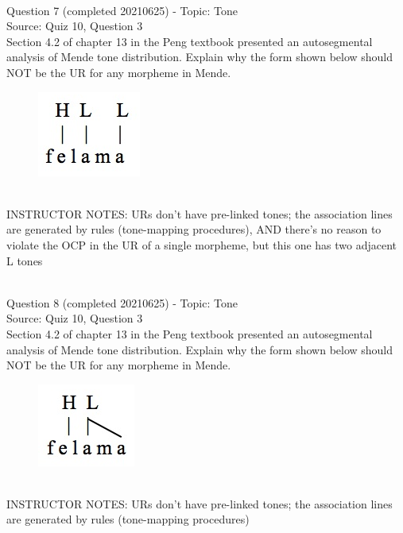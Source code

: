 \documentclass[12pt]{article}
\begin{document}
~\\

{\large Question 7} (completed 20210625) - Topic: Tone\\
Source: Quiz 10, Question 3\\

Section 4.2 of chapter 13 in the Peng textbook presented an autosegmental analysis of Mende tone distribution. Explain why the form shown below should NOT be the UR for any morpheme in Mende.\\

\begin{figure}[H]
\includegraphics{../images/mende_junction_c.png}
\end{figure}

~\\
INSTRUCTOR NOTES: URs don't have pre-linked tones; the association lines are generated by rules (tone-mapping procedures), AND there's no reason to violate the OCP in the UR of a single morpheme, but this one has two adjacent L tones


~\\

{\large Question 8} (completed 20210625) - Topic: Tone\\
Source: Quiz 10, Question 3\\

Section 4.2 of chapter 13 in the Peng textbook presented an autosegmental analysis of Mende tone distribution. Explain why the form shown below should NOT be the UR for any morpheme in Mende.\\

\begin{figure}[H]
\includegraphics{../images/mende_junction_d.png}
\end{figure}

~\\
INSTRUCTOR NOTES: URs don't have pre-linked tones; the association lines are generated by rules (tone-mapping procedures)
\end{document}
